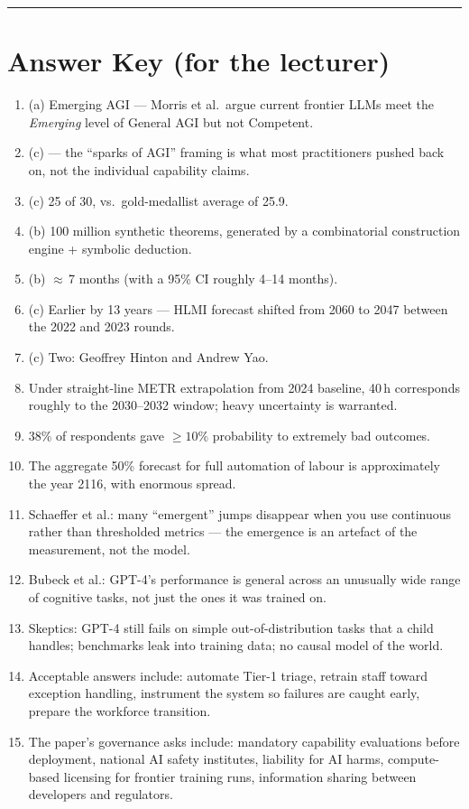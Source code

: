 \documentclass[11pt,a4paper]{article}
\begin{document}
\vspace{2em}
\hrule
\vspace{1em}

\section*{Answer Key (for the lecturer)}

\begin{enumerate}[label=Q\arabic*.]
\item (a) Emerging AGI --- Morris et al.\ argue current frontier LLMs meet
      the \emph{Emerging} level of General AGI but not Competent.
\item (c) --- the ``sparks of AGI'' framing is what most practitioners pushed
      back on, not the individual capability claims.
\item (c) 25 of 30, vs.\ gold-medallist average of 25.9.
\item (b) 100 million synthetic theorems, generated by a combinatorial
      construction engine + symbolic deduction.
\item (b) $\approx$\,7 months (with a 95\% CI roughly 4--14 months).
\item (c) Earlier by 13 years --- HLMI forecast shifted from 2060 to 2047
      between the 2022 and 2023 rounds.
\item (c) Two: Geoffrey Hinton and Andrew Yao.
\item Under straight-line METR extrapolation from 2024 baseline, 40\,h
      corresponds roughly to the 2030--2032 window; heavy uncertainty is
      warranted.
\item 38\% of respondents gave $\geq 10\%$ probability to extremely bad
      outcomes.
\item The aggregate 50\% forecast for full automation of labour is
      approximately the year 2116, with enormous spread.
\item Schaeffer et al.: many ``emergent'' jumps disappear when you use
      continuous rather than thresholded metrics --- the emergence is an
      artefact of the measurement, not the model.
\item Bubeck et al.: GPT-4's performance is general across an unusually
      wide range of cognitive tasks, not just the ones it was trained on.
\item Skeptics: GPT-4 still fails on simple out-of-distribution tasks that
      a child handles; benchmarks leak into training data; no causal model
      of the world.
\item Acceptable answers include: automate Tier-1 triage, retrain staff
      toward exception handling, instrument the system so failures are
      caught early, prepare the workforce transition.
\item The paper's governance asks include: mandatory capability evaluations
      before deployment, national AI safety institutes, liability for AI
      harms, compute-based licensing for frontier training runs, information
      sharing between developers and regulators.
\end{enumerate}
\end{document}
